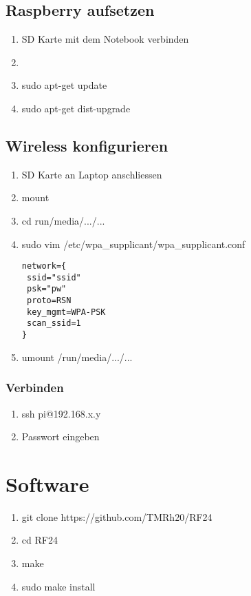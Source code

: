 \subsection{Raspberry aufsetzen}
\begin{enumerate}
	\item SD Karte mit dem Notebook verbinden
	\item 
	\item sudo apt-get update
	\item sudo apt-get dist-upgrade
\end{enumerate}

\subsection{Wireless konfigurieren}
\begin{enumerate}
\item SD Karte an Laptop anschliessen
\item mount 
\item cd run/media/.../...
\item sudo vim /etc/wpa\_supplicant/wpa\_supplicant.conf
\begin{lstlisting}[caption=/etc/wpa\_supplicant/wpa\_supplicant.conf]
network={
 ssid="ssid"
 psk="pw"
 proto=RSN
 key_mgmt=WPA-PSK
 scan_ssid=1
}
\end{lstlisting}
\item umount /run/media/.../...
\end{enumerate}

\subsubsection{Verbinden}
\begin{enumerate}
	\item ssh pi@192.168.x.y
	\item Passwort eingeben
\end{enumerate}

\section{Software}
\begin{enumerate}
	\item git clone https://github.com/TMRh20/RF24
	\item cd RF24
	\item make
	\item sudo make install
\end{enumerate}

